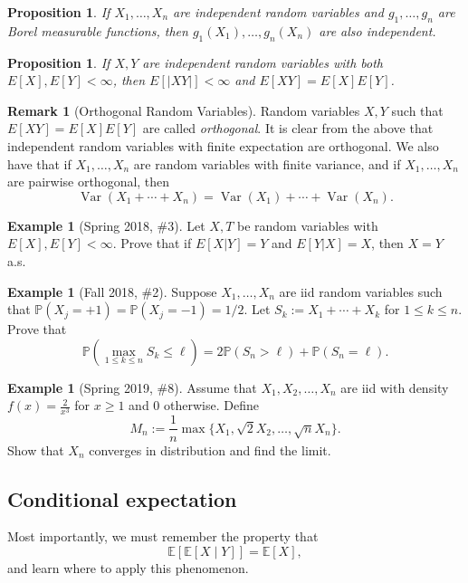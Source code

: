 \documentclass[12pt,reqno]{article}
\renewcommand{\emph}[1]{\textit{#1}}
\theoremstyle{plain}
\newtheorem{prop}[theorem]{Proposition}
\theoremstyle{definition}
\newtheorem{example}[theorem]{Example}
\newtheorem{remark}[theorem]{Remark}
\newcommand{\PP}[1]{\ensuremath{\mathbb{P}\left(#1\right)}}
\begin{document}
\begin{prop}
If $X_1,\ldots,X_n$ are independent random variables and $g_1,\ldots,g_n$ are 
Borel measurable functions, then $g_1(X_1),\ldots,g_n(X_n)$ are also independent. 
\end{prop} 

\begin{prop}
If $X,Y$ are independent random variables with both $E[X],E[Y] < \infty$, then 
$E[|XY|] < \infty$ and $E[XY] = E[X]E[Y]$. 
\end{prop} 

\begin{remark}[Orthogonal Random Variables]
Random variables $X,Y$ such that $E[XY] = E[X]E[Y]$ are called \emph{orthogonal}. 
It is clear from the above that independent random variables with finite expectation 
are orthogonal. We also have that if $X_1,\ldots,X_n$ are random variables with 
finite variance, and if $X_1,\ldots,X_n$ are pairwise orthogonal, then 
\[
\operatorname{Var}(X_1+\cdots+X_n) = \operatorname{Var}(X_1) + \cdots + 
     \operatorname{Var}(X_n). 
\]
\end{remark} 

\begin{example}[Spring 2018, \#3]
Let $X,T$ be random variables with $E[X], E[Y] < \infty$. Prove that if 
$E[X|Y]=Y$ and $E[Y|X] = X$, then $X = Y$ a.s.
\end{example} 

\begin{example}[Fall 2018, \#2]
Suppose $X_1,\ldots,X_n$ are iid random variables such that 
$\PP{X_j = +1} = \PP{X_j = -1} = 1/2$. Let $S_k := X_1+\cdots+X_k$ for 
$1 \leq k \leq n$. Prove that 
\[
\PP{\max_{1 \leq k \leq n} S_k \leq \ell} = 2\PP{S_n > \ell} + 
     \PP{S_n = \ell}. 
\]
\end{example} 

\begin{example}[Spring 2019, \#8]
Assume that $X_1,X_2,\ldots,X_n$ are iid with density $f(x) = \frac{2}{x^3}$ 
for $x \geq 1$ and $0$ otherwise. Define 
\[
M_n := \frac{1}{n} \max\{X_1, \sqrt{2} X_2,\ldots, \sqrt{n} X_n\}.
\]
Show that $X_n$ converges in distribution and find the limit. 
\end{example} 

\subsection{Conditional expectation} 

Most importantly, we must remember the property that 
\[
\mathbb{E}\left[\mathbb{E}\left[X \mid Y\right]\right] = \mathbb{E}[X], 
\]
and learn where to apply this phenomenon. 
\end{document}
